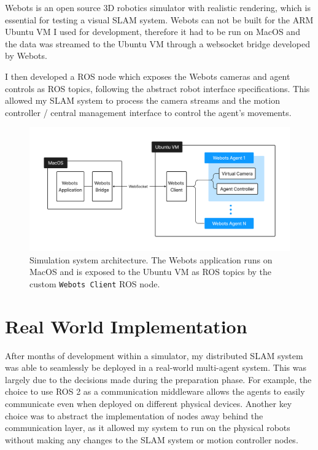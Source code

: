 Webots is an open source 3D robotics simulator with realistic rendering, which is essential for testing a visual SLAM system. Webots can not be built for the ARM Ubuntu VM I used for development, therefore it had to be run on MacOS and the data was streamed to the Ubuntu VM through a websocket bridge developed by Webots.

I then developed a ROS node which exposes the Webots cameras and agent controls as ROS topics, following the abstract robot interface specifications. This allowed my SLAM system to process the camera streams and the motion controller / central management interface to control the agent's movements.


\begin{figure}[h]
    \centering
    \includegraphics[trim=5cm 5cm 5cm 5cm, scale=0.2]{figures/simulation_environment.pdf}

    \caption{Simulation system architecture. The Webots application runs on MacOS and is exposed to the Ubuntu VM as ROS topics by the custom \texttt{Webots Client} ROS node.}
    \label{fig:simulation-environment}
\end{figure}

\section{Real World Implementation}
\label{sec:real-world-implementation}
After months of development within a simulator, my distributed SLAM system was able to seamlessly be deployed in a real-world multi-agent system. This was largely due to the decisions made during the preparation phase. For example, the choice to use ROS 2 as a communication middleware allows the agents to easily communicate even when deployed on different physical devices. Another key choice was to abstract the implementation of nodes away behind the communication layer, as it allowed my system to run on the physical robots without making any changes to the SLAM system or motion controller nodes.

